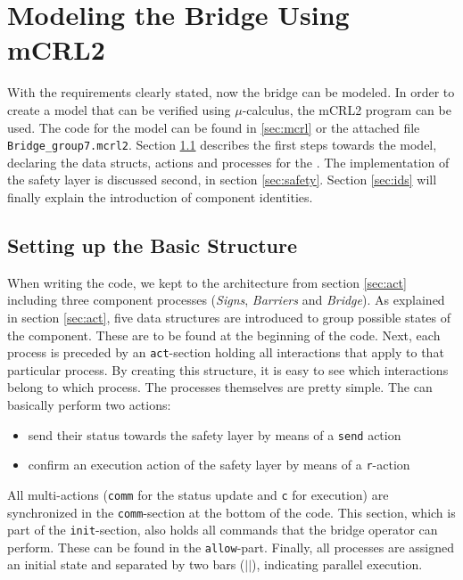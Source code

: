 \section{Modeling the Bridge Using mCRL2}
\label{sec:model}

With the requirements clearly stated, now the bridge can be modeled. In order to create a model that can be verified using $\mu$-calculus, the mCRL2 program can be used. The code for the model can be found in \ref{sec:mcrl} or the attached file \texttt{Bridge\_group7.mcrl2}. Section \ref{sec:basic} describes the first steps towards the model, declaring the data structs, actions and processes for the . The implementation of the safety layer is discussed second, in section \ref{sec:safety}. Section \ref{sec:ids} will finally explain the introduction of component identities.

\subsection{Setting up the Basic Structure}
\label{sec:basic}
When writing the code, we kept to the architecture from section \ref{sec:act} including three component processes (\emph{Signs}, \emph{Barriers} and \emph{Bridge}). As explained in section \ref{sec:act}, five data structures are introduced to group possible states of the component. These are to be found at the beginning of the code. Next, each process is preceded by an \texttt{act}-section holding all interactions that apply to that particular process. By creating this structure, it is easy to see which interactions belong to which process. The processes themselves are pretty simple. The can basically perform two actions:
%
\begin{itemize}
	\item send their status towards the safety layer by means of a \texttt{send} action
	\item confirm an execution action of the safety layer by means of a \texttt{r}-action
\end{itemize}
%
All multi-actions (\texttt{comm} for the status update and \texttt{c} for execution) are synchronized in the \texttt{comm}-section at the bottom of the code. This section, which is part of the \texttt{init}-section, also holds all commands that the bridge operator can perform. These can be found in the \texttt{allow}-part. Finally, all processes are assigned an initial state and separated by two bars ($||$), indicating parallel execution. 

